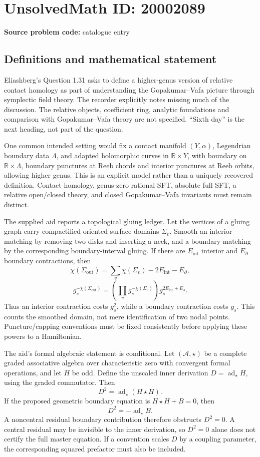 \documentclass[11pt]{article}
\newcommand{\R}{\mathbb{R}}
\begin{document}
\section*{UnsolvedMath ID: 20002089}
\textbf{Source problem code:} catalogue entry
\subsection{Definitions and mathematical statement}
Eliashberg's Question 1.31 asks to define a higher-genus version of relative contact homology as part of understanding the Gopakumar--Vafa picture through symplectic field theory. The recorder explicitly notes missing much of the discussion. The relative objects, coefficient ring, analytic foundations and comparison with Gopakumar--Vafa theory are not specified. ``Sixth day'' is the next heading, not part of the question.

One common intended setting would fix a contact manifold \((Y,\alpha)\), Legendrian boundary data \(\Lambda\), and adapted holomorphic curves in \(\R\times Y\), with boundary on \(\R\times\Lambda\), boundary punctures at Reeb chords and interior punctures at Reeb orbits, allowing higher genus. This is an explicit model rather than a uniquely recovered definition. Contact homology, genus-zero rational SFT, absolute full SFT, a relative open/closed theory, and closed Gopakumar--Vafa invariants must remain distinct.

The supplied aid reports a topological gluing ledger. Let the vertices of a gluing graph carry compactified oriented surface domains \(\Sigma_v\). Smooth an interior matching by removing two disks and inserting a neck, and a boundary matching by the corresponding boundary-interval gluing. If there are \(E_{\mathrm{int}}\) interior and \(E_{\partial}\) boundary contractions, then
\[
\chi(\Sigma_{\mathrm{out}})=\sum_v\chi(\Sigma_v)-2E_{\mathrm{int}}-E_{\partial},
\]
\[
g_s^{-\chi(\Sigma_{\mathrm{out}})}
=\left(\prod_vg_s^{-\chi(\Sigma_v)}\right)
g_s^{2E_{\mathrm{int}}+E_{\partial}}.
\]
Thus an interior contraction costs \(g_s^2\), while a boundary contraction costs \(g_s\). This counts the smoothed domain, not mere identification of two nodal points. Puncture/capping conventions must be fixed consistently before applying these powers to a Hamiltonian.

The aid's formal algebraic statement is conditional. Let \((\mathcal A,\star)\) be a complete graded associative algebra over characteristic zero with convergent formal operations, and let \(H\) be odd. Define the unscaled inner derivation \(D=\operatorname{ad}_\star H\), using the graded commutator. Then
\[
D^2=\operatorname{ad}_\star(H\star H).
\]
If the proposed geometric boundary equation is \(H\star H+B=0\), then
\[
D^2=-\operatorname{ad}_\star B.
\]
A noncentral residual boundary contribution therefore obstructs \(D^2=0\). A central residual may be invisible to the inner derivation, so \(D^2=0\) alone does not certify the full master equation. If a convention scales \(D\) by a coupling parameter, the corresponding squared prefactor must also be included.
\end{document}
